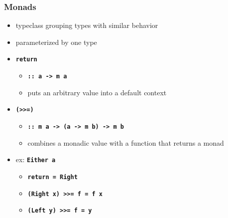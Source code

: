 \documentclass{beamer}
\newcommand{\lit}[1]{\textbf{\texttt{#1}}}
\begin{document}
\begin{frame}
  \frametitle{Monads}
  \begin{itemize}
  \pause\item typeclass grouping types with similar behavior
  \pause\item parameterized by one type
  \pause\item \lit{return}
  \begin{itemize}
  \item \lit{::\ a -> m a}
    \pause  \item puts an arbitrary value into a default context
  \end{itemize}
  \pause\item \lit{(>>=)}
  \begin{itemize}
  \item \lit{::\ m a -> (a -> m b) -> m b}
    \pause\item combines a monadic value with a function that returns a monad
  \end{itemize}
  \pause\item ex: \lit{Either a}
  \begin{itemize}
    \pause\item \lit{return = Right}
    \pause\item \lit{(Right x) >>= f = f x}
    \item \lit{(Left y) >>= f = y}
  \end{itemize}
  \end{itemize}
\end{frame}
\end{document}
